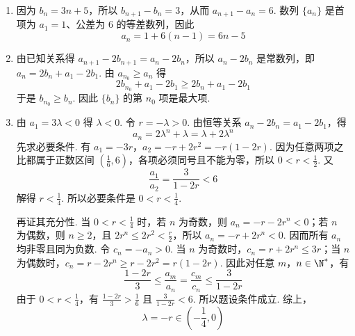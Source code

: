 \begin{solution}
\begin{enumerate}
\item 因为 \(b_{n}=3n+5\)，所以 \(b_{n+1}-b_{n}=3\)，从而 \(a_{n+1}-a_{n}=6\). 数列 \(\{a_{n}\}\) 是首项为 \(a_{1}=1\)、公差为 \(6\) 的等差数列，因此
\[
a_{n}=1+6(n-1)=6n-5
\]
\item 由已知关系得 \(a_{n+1}-2b_{n+1}=a_{n}-2b_{n}\)，所以 \(a_{n}-2b_{n}\) 是常数列，即 \(a_{n}=2b_{n}+a_{1}-2b_{1}\). 由 \(a_{n_{0}}\geqslant a_{n}\) 得
\[
2b_{n_{0}}+a_{1}-2b_{1}\geqslant2b_{n}+a_{1}-2b_{1}
\]
于是 \(b_{n_{0}}\geqslant b_{n}\). 因此 \(\{b_{n}\}\) 的第 \(n_{0}\) 项是最大项.
\item 由 \(a_{1}=3\lambda<0\) 得 \(\lambda<0\). 令 \(r=-\lambda>0\). 由恒等关系 \(a_{n}-2b_{n}=a_{1}-2b_{1}\)，得
\[
a_{n}=2\lambda^{n}+\lambda=\lambda+2\lambda^{n}
\]
先求必要条件. 有 \(a_{1}=-3r\)，\(a_{2}=-r+2r^{2}=-r(1-2r)\). 因为任意两项之比都属于正数区间 \(\left(\frac{1}{6},6\right)\)，各项必须同号且不能为零，所以 \(0<r<\frac{1}{2}\). 又
\[
\frac{a_{1}}{a_{2}}=\frac{3}{1-2r}<6
\]
解得 \(r<\frac{1}{4}\). 所以必要条件是 \(0<r<\frac{1}{4}\).

再证其充分性. 当 \(0<r<\frac{1}{4}\) 时，若 \(n\) 为奇数，则 \(a_{n}=-r-2r^{n}<0\)；若 \(n\) 为偶数，则 \(n\geqslant2\)，且 \(2r^{n}\leqslant2r^{2}<\frac{r}{2}\)，所以 \(a_{n}=-r+2r^{n}<0\). 因而所有 \(a_{n}\) 均非零且同为负数. 令 \(c_{n}=-a_{n}>0\). 当 \(n\) 为奇数时，\(c_{n}=r+2r^{n}\leqslant3r\)；当 \(n\) 为偶数时，\(c_{n}=r-2r^{n}\geqslant r-2r^{2}=r(1-2r)\). 因此对任意 \(m\)，\(n\in\N^*\)，有
\[
\frac{1-2r}{3}\leqslant\frac{a_{m}}{a_{n}}=\frac{c_{m}}{c_{n}}\leqslant\frac{3}{1-2r}
\]
由于 \(0<r<\frac{1}{4}\)，有 \(\frac{1-2r}{3}>\frac{1}{6}\) 且 \(\frac{3}{1-2r}<6\). 所以题设条件成立. 综上，
\[
\lambda=-r\in\left(-\frac{1}{4},0\right)
\]
\end{enumerate}
\end{solution}
